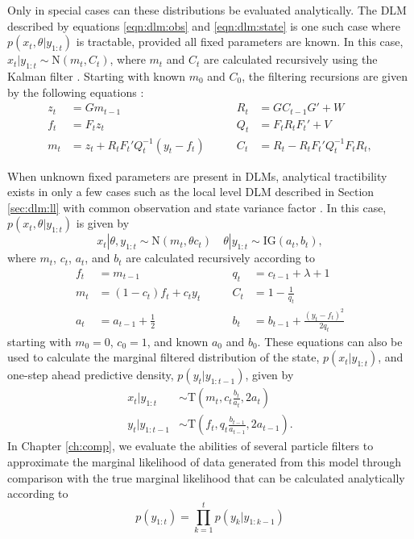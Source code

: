 Only in special cases can these distributions be evaluated analytically. The DLM described by equations \eqref{eqn:dlm:obs} and \eqref{eqn:dlm:state} is one such case where $p(x_t,\theta| y_{1:t})$ is tractable, provided all fixed parameters are known. In this case, $x_t|y_{1:t} \sim \mbox{N}(m_t,C_t)$, where $m_t$ and $C_t$ are calculated recursively using the Kalman filter \citep{kal:1960:ekf}. Starting with known $m_0$ and $C_0$, the filtering recursions are given by the following equations \cite[Sec 2.7.2][]{petris:camp:2009:dynamic}:
\begin{align}
z_t &= Gm_{t-1} &\qquad R_t &= GC_{t-1}G' + W \label{eqn:dlm:kal} \\
f_t &= F_tz_t &\qquad Q_t &= F_tR_tF_t' + V \nonumber \\
m_t &= z_t + R_tF_t'Q_t^{-1}(y_t-f_t) &\qquad C_t &= R_t - R_tF_t'Q_t^{-1}F_tR_t, \nonumber
\end{align}

When unknown fixed parameters are present in DLMs, analytical tractibility exists in only a few cases such as the local level DLM described in Section \ref{sec:dlm:ll} with common observation and state variance factor \cite[Sec 4.3][]{petris:camp:2009:dynamic}. In this case, $p(x_t,\theta|y_{1:t})$ is given by
\begin{equation}
x_t|\theta,y_{1:t} \sim \mbox{N}(m_t,\theta c_t) \quad \theta|y_{1:t} \sim \mbox{IG}(a_t, b_t), \label{eqn:ll:post}
\end{equation}
where $m_t$, $c_t$, $a_t$, and $b_t$ are calculated recursively according to
\begin{align}
f_t &= m_{t-1} &\qquad q_t &= c_{t-1} + \lambda + 1 \label{eqn:ll:kal} \\
m_t &= (1 - c_t)f_t + c_ty_t &\qquad C_t &= 1 - \frac{1}{q_t} \nonumber \\
a_t &= a_{t-1} + \frac{1}{2} &\qquad b_t &= b_{t-1} + \frac{(y_t-f_t)^2}{2q_t} \nonumber
\end{align}
starting with $m_0 = 0$, $c_0 = 1$, and known $a_0$ and $b_0$. These equations can also be used to calculate the marginal filtered distribution of the state, $p(x_t|y_{1:t})$, and one-step ahead predictive density, $p(y_t|y_{1:t-1})$, given by
\begin{align}
x_t|y_{1:t} &\sim \mbox{T}(m_t,c_t \frac{b_t}{a_t},2a_t) \label{eqn:ll:marg} \\
y_t|y_{1:t-1} &\sim \mbox{T}(f_t,q_t \frac{b_{t-1}}{a_{t-1}},2a_{t-1}). \label{eqn:ll:onestep}
\end{align}
In Chapter \ref{ch:comp}, we evaluate the abilities of several particle filters to approximate the marginal likelihood of data generated from this model through comparison with the true marginal likelihood that can be calculated analytically according to
\begin{equation}
p(y_{1:t}) = \prod_{k=1}^t p(y_k|y_{1:k-1}) \label{eqn:ll:marglik}
\end{equation}

